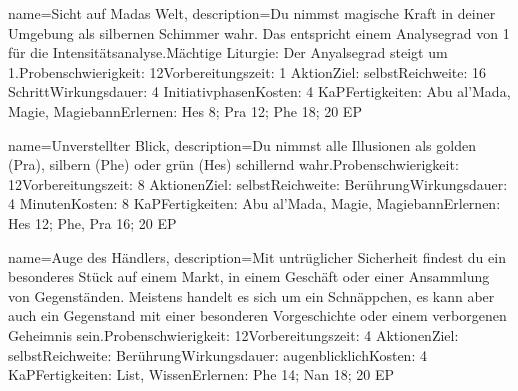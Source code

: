 {
    name={Sicht auf Madas Welt},
    description={Du nimmst magische Kraft in deiner Umgebung als silbernen Schimmer wahr. Das entspricht einem Analysegrad von 1 für die Intensitätsanalyse.\newline Mächtige Liturgie: Der Anyalsegrad steigt um 1.\newline Probenschwierigkeit: 12\newline Vorbereitungszeit: 1 Aktion\newline Ziel: selbst\newline Reichweite: 16 Schritt\newline Wirkungsdauer: 4 Initiativphasen\newline Kosten: 4 KaP\newline Fertigkeiten: Abu al'Mada, Magie, Magiebann\newline Erlernen: Hes 8; Pra 12; Phe 18; 20 EP}
}


{
    name={Unverstellter Blick},
    description={Du nimmst alle Illusionen als golden (Pra), silbern (Phe) oder grün (Hes) schillernd wahr.\newline Probenschwierigkeit: 12\newline Vorbereitungszeit: 8 Aktionen\newline Ziel: selbst\newline Reichweite: Berührung\newline Wirkungsdauer: 4 Minuten\newline Kosten: 8 KaP\newline Fertigkeiten: Abu al'Mada, Magie, Magiebann\newline Erlernen: Hes 12; Phe, Pra 16; 20 EP}
}


{
    name={Auge des Händlers},
    description={Mit untrüglicher Sicherheit findest du ein besonderes Stück auf einem Markt, in einem Geschäft oder einer Ansammlung von Gegenständen. Meistens handelt es sich um ein Schnäppchen, es kann aber auch ein Gegenstand mit einer besonderen Vorgeschichte oder einem verborgenen Geheimnis sein.\newline Probenschwierigkeit: 12\newline Vorbereitungszeit: 4 Aktionen\newline Ziel: selbst\newline Reichweite: Berührung\newline Wirkungsdauer: augenblicklich\newline Kosten: 4 KaP\newline Fertigkeiten: List, Wissen\newline Erlernen: Phe 14; Nan 18; 20 EP}
}


